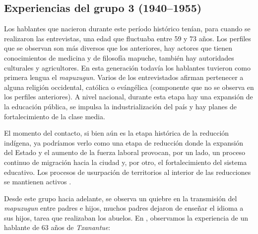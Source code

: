 \documentclass[output=paper]{../langscibook}
\begin{document}
\subsection{Experiencias del grupo 3 (1940--1955)}



Los hablantes que nacieron durante este período histórico tenían, para cuando se realizaron las entrevistas, una edad que fluctuaba entre 59 y 73 años. Los perfiles que se observan son más diversos que los anteriores, hay actores que tienen conocimientos de medicina y de filosofía mapuche, también hay autoridades culturales y agricultores. En esta generación todavía los hablantes tuvieron como primera lengua el \textit{mapuzugun}. Varios de los entrevistados afirman pertenecer a alguna religión occidental, católica o evángélica (componente que no se observa en los perfiles anteriores). A nivel nacional, durante esta etapa hay una expansión de la educación pública, se impulsa la industrialización del país y hay planes de fortalecimiento de la clase media. 

El momento del contacto, si bien aún es la etapa histórica de la reducción indígena, ya podríamos verlo como una etapa de reducción donde la expansión del Estado y el aumento de la fuerza laboral provocan, por un lado, un proceso continuo de migración hacia la ciudad y, por otro, el fortalecimiento del sistema educativo. Los procesos de usurpación de territorios al interior de las reducciones se mantienen activos {\citet{ImilanÁlvarez2007}}.

Desde este grupo hacia adelante, se observa un quiebre en la transmisión del \textit{mapuzugun} entre padres e hijos, muchos padres dejaron de enseñar el idioma a sus hijos, tarea que realizaban los abuelos. En , observamos la experiencia de un hablante de 63 años de \textit{Txanantue}:
\end{document}
